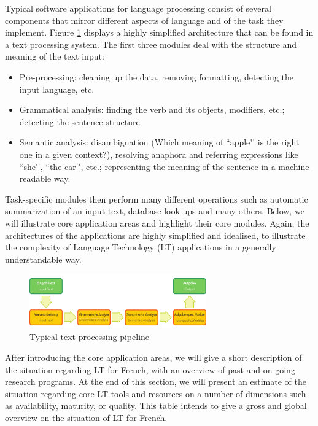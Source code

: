 \documentclass[]{../metanetpaper}
\begin{document}
\begin{multicols}{2}
Typical software applications for language processing consist of
several components that mirror different aspects of language and of
the task they implement. Figure \ref{fig:textprocarchiEng} displays a highly
simplified architecture that can be found in a text processing
system. The first three modules deal with the structure and meaning of
the text input:
\begin{itemize}
\item Pre-processing: cleaning up the data, removing formatting,
  detecting the input language, etc.
\item Grammatical analysis: finding the verb and its objects,
  modifiers, etc.; detecting the sentence structure.
\item Semantic analysis: disambiguation (Which meaning of ``apple{\mbox '}{\mbox '} is the
  right one in a given context?), resolving anaphora and referring
  expressions like ``she{\mbox '}{\mbox '}, ``the car{\mbox '}{\mbox '}, etc.; representing the meaning of the
  sentence in a machine-readable way.
\end{itemize}

Task-specific modules then perform many different operations such as
automatic summarization of an input text, database look-ups and many
others. Below, we will illustrate core application areas and highlight
their core modules. Again, the architectures of the applications are
highly simplified and idealised, to illustrate the complexity of
Language Technology (LT) applications in a generally understandable
way.

\begin{figure}
\begin{center}
 \includegraphics[width=3.0in]{../_media/text_processing_app_architecture}
\caption{Typical text processing pipeline}
\label{fig:textprocarchiEng}
\end{center}
\end{figure}

After introducing the core application areas, we will give a short
description of the situation regarding LT for French, with an overview
of past and on-going research programs. At the end of this section, we
will present an estimate of the situation regarding core LT tools and
resources on a number of dimensions such as availability, maturity, or
quality. This table intends to give a gross and global overview on the
situation of LT for French.


\end{multicols}
\end{document}
